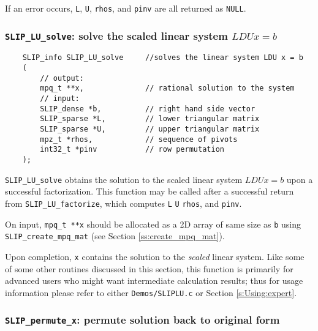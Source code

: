 \documentclass[12pt]{article}
\theoremstyle{definition}
\begin{document}
If an error occurs, \verb|L|, \verb|U|, \verb|rhos|, and \verb|pinv| are all
returned as \verb|NULL|.

\cprotect\subsubsection{\verb|SLIP_LU_solve|: solve the scaled linear system $LDUx=b$}
\label{ss:SLIP_LU_solve}

\begin{mdframed}[userdefinedwidth=6in]
{\footnotesize
\begin{verbatim}
    SLIP_info SLIP_LU_solve     //solves the linear system LDU x = b
    (
        // output:
        mpq_t **x,              // rational solution to the system
        // input:
        SLIP_dense *b,          // right hand side vector
        SLIP_sparse *L,         // lower triangular matrix
        SLIP_sparse *U,         // upper triangular matrix
        mpz_t *rhos,            // sequence of pivots
        int32_t *pinv           // row permutation
    );
\end{verbatim}
} \end{mdframed}

\verb|SLIP_LU_solve| obtains the solution to the scaled linear system $LDUx=b$
upon a successful factorization.  This function may be called after a
successful return from \verb|SLIP_LU_factorize|, which computes \verb|L|
\verb|U| \verb|rhos|, and \verb|pinv|. 

On input, \verb|mpq_t **x| should be allocated as a 2D array of same size as
\verb|b| using \verb|SLIP_create_mpq_mat| (see Section
\ref{ss:create_mpq_mat}).

Upon completion, \verb|x| contains the solution to the \textit{scaled} linear
system. Like some of some other routines discussed in this section, this
function is primarily for advanced users who might want intermediate
calculation results; thus for usage information please refer to either
\verb|Demos/SLIPLU.c| or Section \ref{s:Using:expert}.

\cprotect\subsubsection{\verb|SLIP_permute_x|: permute solution back to original form}
\label{ss:SLIP_permute_x}
\end{document}
